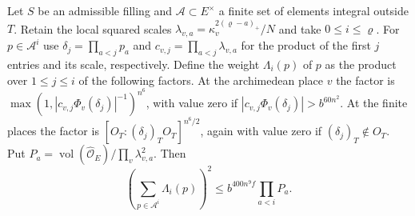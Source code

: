 \begin{lemma}
\label{lem:b-poisson-head-weights}
\emitthmsource
Let $S$ be an admissible filling and $\mathcal A\subset E^\times$ a finite set of elements integral outside $T$.
Retain the local squared scales $\lambda_{v,a}=\kappa_v^{2(\varrho-a)_+}/N$ and take $0\le i\le\varrho$.
For $p\in\mathcal A^i$ use
$\delta_j=\prod_{a<j}p_a$ and $c_{v,j}=\prod_{a<j}\lambda_{v,a}$ for the product of the first $j$ entries and its scale, respectively.
Define the weight $\Lambda_i(p)$ of $p$ as the product over $1\le j\le i$ of the following factors.
At the archimedean place $v$ the factor is $\max(1,|c_{v,j}\Phi_v(\delta_j)|^{-1})^{n^6}$,
with value zero if $|c_{v,j}\Phi_v(\delta_j)|>b^{60n^2}$.
At the finite places the factor is $[O_T:(\delta_j)_TO_T]^{n^6/2}$,
again with value zero if $(\delta_j)_T\notin O_T$.
Put $P_a=\operatorname{vol}(\widehat{\mathcal O}_E)/\prod_v\lambda_{v,a}^2$.
Then
\[
 \left(\sum_{p\in\mathcal A^i}\Lambda_i(p)\right)^2
 \le b^{400n^9f}\prod_{a<i}P_a .
\]
\end{lemma}
